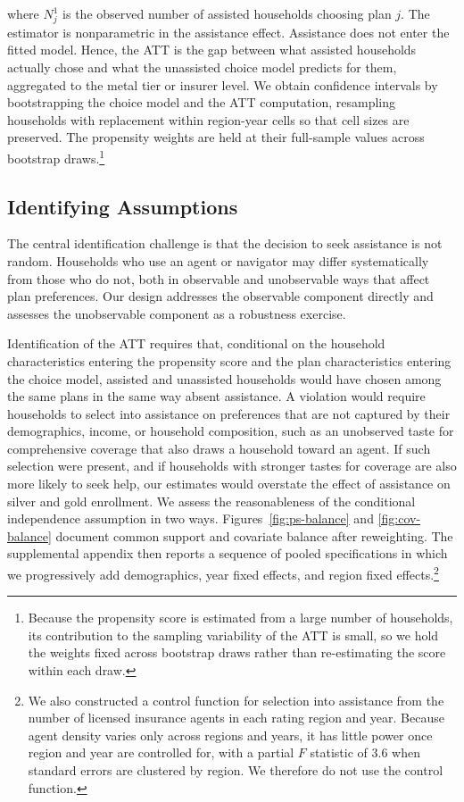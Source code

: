 \documentclass[12pt]{article}
\begin{document}
\noindent where $N^{1}_{j}$ is the observed number of assisted households choosing plan $j$.  The estimator is nonparametric in the assistance effect. Assistance does not enter  the fitted model. Hence, the ATT is the gap between what assisted households actually chose and what the unassisted choice model predicts for them, aggregated to the metal tier or insurer level. We obtain confidence intervals by bootstrapping the choice model and the ATT computation, resampling households with replacement within region-year cells so that cell sizes are preserved. The propensity weights are held at their full-sample values across bootstrap draws.\footnote{Because the propensity score is estimated from a large number of households, its contribution to the sampling variability of the ATT is small, so we hold the weights fixed across bootstrap draws rather than re-estimating the score within each draw.}

\subsection{Identifying Assumptions}
\label{subsec:identification}

The central identification challenge is that the decision to seek assistance is not random. Households who use an agent or navigator may differ systematically from those who do not, both in observable and unobservable ways that affect plan preferences. Our design addresses the observable component directly and assesses the unobservable component as a robustness exercise.

Identification of the ATT requires that, conditional on the household characteristics entering the propensity score and the plan characteristics entering the choice model, assisted and unassisted households would have chosen among the same plans in the same way absent assistance. A violation would require households to select into assistance on preferences that are not captured by their demographics, income, or household composition, such as an unobserved taste for comprehensive coverage that also draws a household toward an agent. If such selection were present, and if households with stronger tastes for coverage are also more likely to seek help, our estimates would overstate the effect of assistance on silver and gold enrollment. We assess the reasonableness of the conditional independence assumption in two ways. Figures~\ref{fig:ps-balance} and \ref{fig:cov-balance} document common support and covariate balance after reweighting. The supplemental appendix then reports a sequence of pooled specifications in which we progressively add demographics, year fixed effects, and region fixed effects.\footnote{We also constructed a control function for selection into assistance from the number of licensed insurance agents in each rating region and year. Because agent density varies only across regions and years, it has little power once region and year are controlled for, with a partial $F$ statistic of 3.6 when standard errors are clustered by region. We therefore do not use the control function.}
\end{document}
